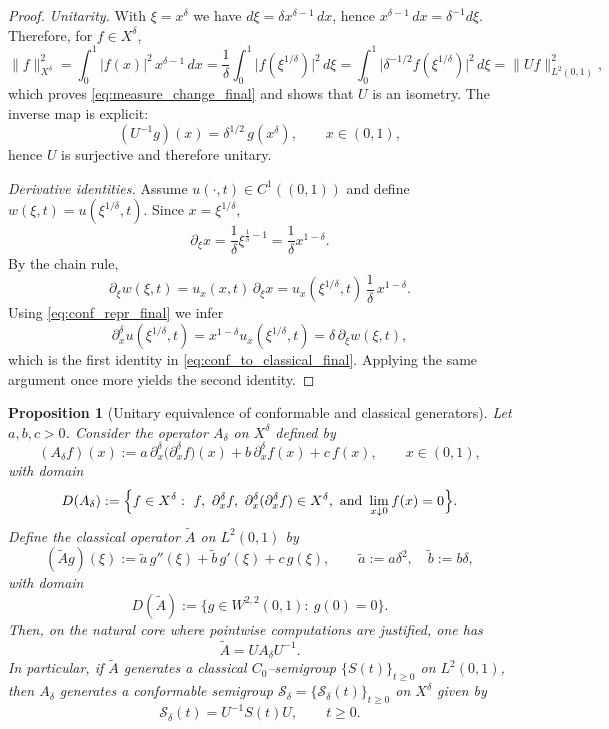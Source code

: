 \documentclass[preprint,12pt]{elsarticle}
\newtheorem{proposition}{Proposition}
\newtheorem{proof}{Proof}
\begin{document}
\begin{proof}
\emph{Unitarity.}
With $\xi=x^\delta$ we have $d\xi=\delta x^{\delta-1}\,dx$, hence
$x^{\delta-1}\,dx=\delta^{-1}d\xi$.
Therefore, for $f\in X^\delta$,
\[
\|f\|_{X^\delta}^2
=
\int_0^1 |f(x)|^2\,x^{\delta-1}\,dx
=
\frac1\delta\int_0^1 \bigl|f(\xi^{1/\delta})\bigr|^2\,d\xi
=
\int_0^1 \bigl|\delta^{-1/2}f(\xi^{1/\delta})\bigr|^2\,d\xi
=
\|Uf\|_{L^2(0,1)}^2,
\]
which proves \eqref{eq:measure_change_final} and shows that $U$ is an isometry.
The inverse map is explicit:
\[
(U^{-1}g)(x)=\delta^{1/2}\,g(x^\delta),\qquad x\in(0,1),
\]
hence $U$ is surjective and therefore unitary.

\medskip
\emph{Derivative identities.}
Assume $u(\cdot,t)\in C^1((0,1))$ and define $w(\xi,t)=u(\xi^{1/\delta},t)$.
Since $x=\xi^{1/\delta}$,
\[
\partial_\xi x=\frac{1}{\delta}\xi^{\frac1\delta-1}
=\frac{1}{\delta}x^{1-\delta}.
\]
By the chain rule,
\[
\partial_\xi w(\xi,t)
=
u_x(x,t)\,\partial_\xi x
=
u_x(\xi^{1/\delta},t)\,\frac{1}{\delta}\,x^{1-\delta}.
\]
Using \eqref{eq:conf_repr_final} we infer
\[
\partial_x^\delta u(\xi^{1/\delta},t)
=
x^{1-\delta}u_x(\xi^{1/\delta},t)
=
\delta\,\partial_\xi w(\xi,t),
\]
which is the first identity in \eqref{eq:conf_to_classical_final}.
Applying the same argument once more yields the second identity.
\end{proof}

\begin{proposition}[Unitary equivalence of conformable and classical generators]\label{prop:conjugacy_operator}
Let $a,b,c>0$.
Consider the operator $A_\delta$ on $X^\delta$ defined by
\[
(A_\delta f)(x):=a\,\partial_x^\delta\!\bigl(\partial_x^\delta f\bigr)(x)+b\,\partial_x^\delta f(x)+c\,f(x),
\qquad x\in(0,1),
\]
with domain
\[
D(A_\delta):=\Bigl\{f\in X^\delta:\ f,\ \partial_x^\delta f,\ \partial_x^\delta(\partial_x^\delta f)\in X^\delta,
\ \text{and}\ \lim_{x\downarrow 0}f(x)=0\Bigr\}.
\]
Define the classical operator $\widetilde A$ on $L^2(0,1)$ by
\[
(\widetilde A g)(\xi):=\widetilde a\,g''(\xi)+\widetilde b\,g'(\xi)+c\,g(\xi),
\qquad
\widetilde a:=a\delta^2,\quad \widetilde b:=b\delta,
\]
with domain
\[
D(\widetilde A):=\{g\in W^{2,2}(0,1):\ g(0)=0\}.
\]
Then, on the natural core where pointwise computations are justified, one has
\begin{equation}\label{eq:conjugacy_final}
\widetilde A = U A_\delta U^{-1}.
\end{equation}
In particular, if $\widetilde A$ generates a classical $C_0$--semigroup $\{S(t)\}_{t\ge 0}$ on $L^2(0,1)$,
then $A_\delta$ generates a conformable semigroup $\mathcal S_\delta=\{\mathcal S_\delta(t)\}_{t\ge0}$
on $X^\delta$ given by
\[
\mathcal S_\delta(t)=U^{-1}S(t)U,\qquad t\ge 0.
\]
\end{proposition}
\end{document}
